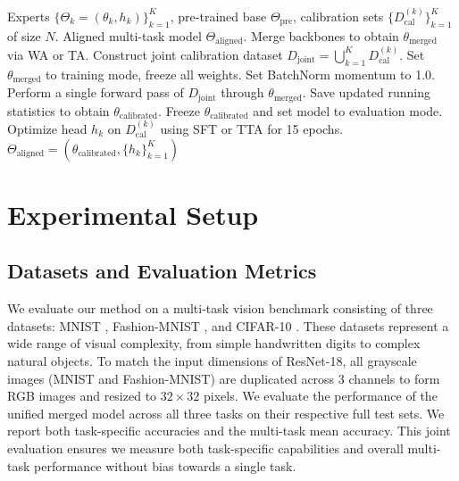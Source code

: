 \documentclass{article}
\theoremstyle{plain}
\theoremstyle{definition}
\theoremstyle{remark}
\begin{document}
\begin{algorithm}[tb]
\caption{Dual-Phase REDA Framework}
\label{alg:reda}
\begin{algorithmic}[1]
 Experts $\{\Theta_k = (\theta_k, h_k)\}_{k=1}^K$, pre-trained base $\Theta_{\text{pre}}$, calibration sets $\{D_{\text{cal}}^{(k)}\}_{k=1}^K$ of size $N$.
 Aligned multi-task model $\Theta_{\text{aligned}}$.
\STATE Merge backbones to obtain $\theta_{\text{merged}}$ via WA or TA.
\STATE {}
\STATE Construct joint calibration dataset $D_{\text{joint}} = \bigcup_{k=1}^K D_{\text{cal}}^{(k)}$.
\STATE Set $\theta_{\text{merged}}$ to training mode, freeze all weights.
\STATE Set BatchNorm momentum to 1.0.
\STATE Perform a single forward pass of $D_{\text{joint}}$ through $\theta_{\text{merged}}$.
\STATE Save updated running statistics to obtain $\theta_{\text{calibrated}}$.
\STATE {}
\STATE Freeze $\theta_{\text{calibrated}}$ and set model to evaluation mode.
    \STATE Optimize head $h_k$ on $D_{\text{cal}}^{(k)}$ using SFT or TTA for 15 epochs.
\ENDFOR
{} $\Theta_{\text{aligned}} = (\theta_{\text{calibrated}}, \{h_k\}_{k=1}^K)$
\end{algorithmic}
\end{algorithm}

\section{Experimental Setup}
\label{sec:setup}

\subsection{Datasets and Evaluation Metrics}
We evaluate our method on a multi-task vision benchmark consisting of three datasets: MNIST \cite{mnist}, Fashion-MNIST \cite{fashionmnist}, and CIFAR-10 \cite{cifar10}. These datasets represent a wide range of visual complexity, from simple handwritten digits to complex natural objects. To match the input dimensions of ResNet-18, all grayscale images (MNIST and Fashion-MNIST) are duplicated across 3 channels to form RGB images and resized to $32 \times 32$ pixels.
We evaluate the performance of the unified merged model across all three tasks on their respective full test sets. We report both task-specific accuracies and the multi-task mean accuracy. This joint evaluation ensures we measure both task-specific capabilities and overall multi-task performance without bias towards a single task.
\end{document}
